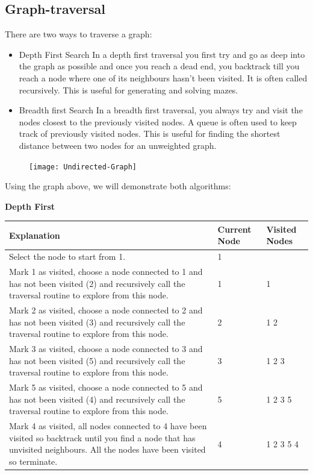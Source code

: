 \subsection{Graph-traversal}
  \noindent
  There are two ways to traverse a graph:
  \begin{itemize}
  	\item Depth First Search
	  	\subitem In a depth first traversal you first try and go as deep into the graph as possible and once you reach a dead end, you backtrack till you reach a node where one of its neighbours hasn't been visited. It is often called recursively. This is useful for generating and solving mazes.
  	\item Breadth first Search
	  	\subitem In a breadth first traversal, you always try and visit the nodes closest to the previously visited nodes. A queue is often used to keep track of previously visited nodes. This is useful for finding the shortest distance between two nodes for an unweighted graph.
  \end{itemize}
  
  \begin{figure}[H]
  	\texttt{[image: Undirected-Graph]}
  \end{figure}
  
  Using the graph above, we will demonstrate both algorithms:
  
  {\large \textbf{Depth First}}
  
  \begin{table}[H]
  	\begin{tabular}{L{0.8\textwidth} | C{0.1\textwidth} | C{0.1\textwidth}}
  		Explanation & Current Node & Visited Nodes\\\hline
  		Select the node to start from 1. & 1 & \\\hline
  		Mark 1 as visited, choose a node connected to 1 and has not been visited (2) and recursively call the traversal routine to explore from this node. & 1 & 1 \\\hline
  		Mark 2 as visited, choose a node connected to 2 and has not been visited (3) and recursively call the traversal routine to explore from this node. & 2 & 1 2 \\\hline
  		Mark 3 as visited, choose a node connected to 3 and has not been visited (5) and recursively call the traversal routine to explore from this node. & 3 & 1 2 3 \\\hline
  		Mark 5 as visited, choose a node connected to 5 and has not been visited (4) and recursively call the traversal routine to explore from this node. & 5 & 1 2 3 5\\\hline
  		Mark 4 as visited, all nodes connected to 4 have been visited so backtrack until you find a node that has unvisited neighbours. All the nodes have been visited so terminate. & 4 & 1 2 3 5 4\\\hline
  	\end{tabular}
  \end{table}
  
